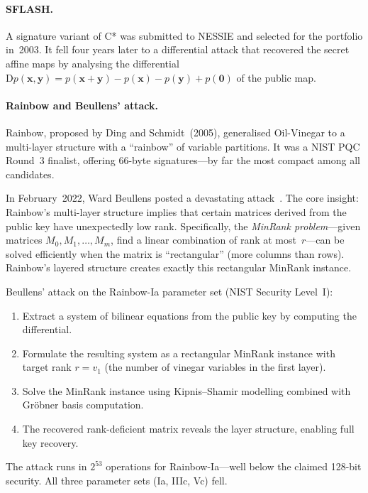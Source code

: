 \paragraph{SFLASH.}
A signature variant of C* was submitted to NESSIE and selected for the portfolio in~2003.  It fell four years later to a differential attack that recovered the secret affine maps by analysing the differential $\mathrm{D}p(\mathbf{x}, \mathbf{y}) = p(\mathbf{x}+\mathbf{y}) - p(\mathbf{x}) - p(\mathbf{y}) + p(\mathbf{0})$ of the public map.

\paragraph{Rainbow and Beullens' attack.}
Rainbow, proposed by Ding and Schmidt~(2005), generalised Oil-Vinegar to a multi-layer structure with a ``rainbow'' of variable partitions.  It was a NIST PQC Round~3 finalist, offering 66-byte signatures---by far the most compact among all candidates.

In February~2022, Ward Beullens posted a devastating attack~\cite{Beullens2022}.  The core insight: Rainbow's multi-layer structure implies that certain matrices derived from the public key have unexpectedly low rank.  Specifically, the \emph{MinRank problem}---given matrices $M_0,M_1,\ldots,M_m$, find a linear combination of rank at most~$r$---can be solved efficiently when the matrix is ``rectangular'' (more columns than rows).  Rainbow's layered structure creates exactly this rectangular MinRank instance.

\begin{example}
\label{ex:rainbow-break}
Beullens' attack on the Rainbow-Ia parameter set (NIST Security Level~I):
\begin{enumerate}
\item Extract a system of bilinear equations from the public key by computing the differential.
\item Formulate the resulting system as a rectangular MinRank instance with target rank $r = v_1$ (the number of vinegar variables in the first layer).
\item Solve the MinRank instance using Kipnis--Shamir modelling combined with Gr\"obner basis computation.
\item The recovered rank-deficient matrix reveals the layer structure, enabling full key recovery.
\end{enumerate}
The attack runs in $2^{53}$ operations for Rainbow-Ia---well below the claimed 128-bit security.  All three parameter sets (Ia, IIIc, Vc) fell.
\end{example}


